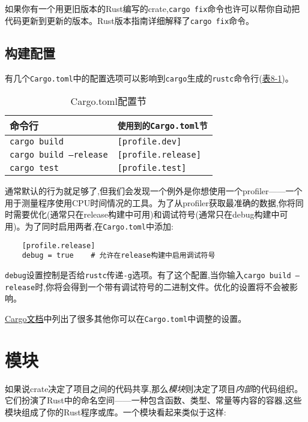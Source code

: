 如果你有一个用更旧版本的Rust编写的crate,\texttt{cargo fix}命令也许可以帮你自动把代码更新到更新的版本。Rust版本指南详细解释了\texttt{cargo fix}命令。

\subsection{构建配置}
有几个\texttt{Cargo.toml}中的配置选项可以影响到\texttt{cargo}生成的\texttt{rustc}命令行(\hyperref[t8-1]{表8-1})。

\begin{table}[htbp]
    \centering
    \caption{Cargo.toml配置节}
    \label{t8-1}
    \begin{tabular}{ll}
        \hline
        \textbf{命令行}     & \texttt{使用到的Cargo.toml节}   \\
        \hline
        \texttt{cargo build} & \texttt{[profile.dev]}   \\
        \rowcolor{tablecolor}
        \texttt{cargo build --release} & \texttt{[profile.release]} \\
        \texttt{cargo test}  & \texttt{[profile.test]}  \\
    \end{tabular}
\end{table}

通常默认的行为就足够了,但我们会发现一个例外是你想使用一个profiler——一个用于测量程序使用CPU时间情况的工具。为了从profiler获取最准确的数据,你将同时需要优化(通常只在release构建中可用)和调试符号(通常只在debug构建中可用)。为了同时启用两者,在\texttt{Cargo.toml}中添加:
\begin{verbatim}
    [profile.release]
    debug = true    # 允许在release构建中启用调试符号
\end{verbatim}

\texttt{debug}设置控制是否给\texttt{rustc}传递\texttt{-g}选项。有了这个配置,当你输入\texttt{cargo build --release}时,你将会得到一个带有调试符号的二进制文件。优化的设置将不会被影响。

\href{https://doc.rust-lang.org/cargo/reference/manifest.html}{Cargo文档}中列出了很多其他你可以在\texttt{Cargo.toml}中调整的设置。

\section{模块}

如果说crate决定了项目之间的代码共享,那么\emph{模块}则决定了项目\emph{内部}的代码组织。它们扮演了Rust中的命名空间——一种包含函数、类型、常量等内容的容器,这些模块组成了你的Rust程序或库。一个模块看起来类似于这样:

